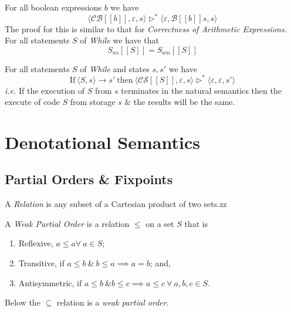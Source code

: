 \documentclass[11pt,a4paper]{article}
\begin{document}
For all boolean expressions $b$ we have
$$\langle\mathcal{CB}[[b]],\varepsilon,s\rangle\rhd^*\langle\varepsilon,\mathcal{B}[[b]]s,s\rangle$$
\nb The proof for this is similar to that for \textit{Correctness of Arithmetic Expressions}.\\

For all statements $S$ of \textit{While} we have that
$$S_{ns}[[S]]=S_{am}[[S]]$$

For all statements $S$ of \textit{While} and states $s,s'$ we have
$$\mathrm{If}\ \langle S,s\rangle\to s'\ \mathrm{then}\ \langle\mathcal{CS}[[S]],\varepsilon,s\rangle\rhd^*\langle\varepsilon,\varepsilon,s'\rangle$$
\textit{i.e.} If the execution of $S$ from $s$ terminates in the natural semantics then the execute of code $S$ from storage $s$ \& the results will be the same.

\section{Denotational Semantics}

\subsection{Partial Orders \& Fixpoints}

A \textit{Relation} is any subset of a Cartesian product of two sets.zz

A \textit{Weak Partial Order} is a relation $\leq$ on a set $S$ that is
\begin{enumerate}[label=\roman*)]
	\item Reflexive, $a\leq a\forall\ a\in S$;
	\item Transitive, if $a\leq b\ \&\ b\leq a\implies a=b$; and,
	\item Antisymmetric, if $a\leq b\ \& b\leq c\implies a\leq c\ \forall\ a,b,c\in S$.
\end{enumerate}

Below the $\subseteq$ relation is a \textit{weak partial order}.\\
\\
\end{document}
